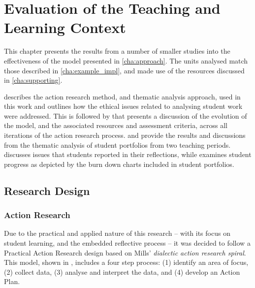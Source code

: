 
\chapter{Evaluation of the Teaching and Learning Context} %
\label{cha:evaluation}

\graphicspath{{Figures/Evaluation/}}

This chapter presents the results from a number of smaller studies into the effectiveness of the model presented in \cref{cha:approach}. The units analysed match those described in \cref{cha:example_impl}, and made use of the resources discussed in \cref{cha:supporting}. 

 describes the action research method, and thematic analysis approach, used in this work and outlines how the ethical issues related to analysing student work were addressed. This is followed by  that presents a discussion of the evolution of the model, and the associated resources and assessment criteria, across all iterations of the action research process.  and  provide the results and discussions from the thematic analysis of student portfolios from two teaching periods.  discusses issues that students reported in their reflections, while  examines student progress as depicted by the burn down charts included in student portfolios. 
 
\section{Research Design} %
\label{sec:research_design}

\subsection{Action Research} %
\label{sub:action_research}

Due to the practical and applied nature of this research -- with its focus on student learning, and the embedded reflective process -- it was decided to follow a Practical Action Research \cite{Creswell:2008} design based on Mills' \cite{Mills:2010} \emph{dialectic action research spiral}. This model, shown in , includes a four step process: (1) identify an area of focus, (2) collect data, (3) analyse and interpret the data, and (4) develop an Action Plan. %

